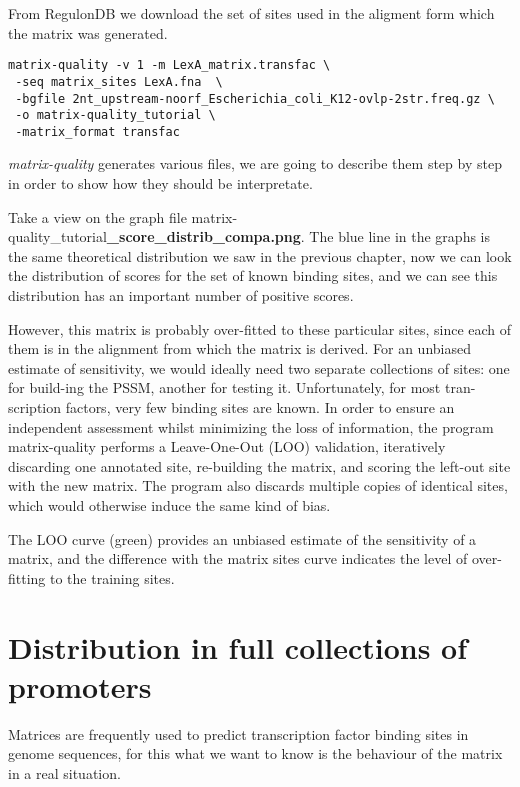 From RegulonDB we download the set of sites used in the aligment form which the matrix was generated.

{\color{Blue} \begin{footnotesize}
\begin{verbatim}
matrix-quality -v 1 -m LexA_matrix.transfac \
 -seq matrix_sites LexA.fna  \
 -bgfile 2nt_upstream-noorf_Escherichia_coli_K12-ovlp-2str.freq.gz \
 -o matrix-quality_tutorial \
 -matrix_format transfac  

\end{verbatim} \end{footnotesize} }

\textit{matrix-quality} generates various files, we are going to
describe them step by step in order to show how they should be
interpretate.

Take a view on the graph file
matrix-quality\_tutorial\textbf{\_score\_distrib\_compa.png}.  The blue
line in the graphs is the same theoretical distribution we saw in the
previous chapter, now we can look the distribution of scores for the
set of known binding sites, and we can see this distribution has an
important number of positive scores. 

However, this matrix is probably over-fitted to these particular
sites, since each of them is in the alignment from which the matrix is
derived. For an unbiased estimate of sensitivity, we would ideally
need two separate collections of sites: one for build-ing the PSSM,
another for testing it. Unfortunately, for most tran-scription
factors, very few binding sites are known. In order to ensure an
independent assessment whilst minimizing the loss of information, the
program matrix-quality performs a Leave-One-Out (LOO) validation,
iteratively discarding one annotated site, re-building the matrix, and
scoring the left-out site with the new matrix. The program also
discards multiple copies of identical sites, which would otherwise
induce the same kind of bias.

The LOO curve (green) provides an unbiased estimate
of the sensitivity of a matrix, and the difference with the matrix
sites curve indicates the level of over-fitting to the
training sites.  

\section{Distribution in full collections of promoters}

Matrices are frequently used to predict transcription factor binding
sites in genome sequences, for this what we want to know is the
behaviour of the matrix in a real situation.

